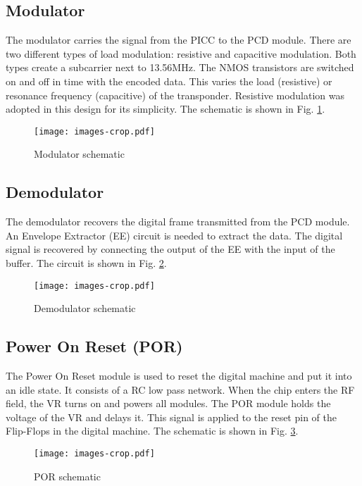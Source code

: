 \subsection{Modulator}

The modulator \cite{rfid_modulador} carries the signal from the PICC to the PCD module. There are two different types of load modulation: resistive and capacitive modulation. Both types create a subcarrier next to 13.56MHz. The NMOS transistors are switched on and off in time with the encoded data. This varies the load (resistive) or resonance frequency  (capacitive) of the transponder.  Resistive modulation was adopted in this design for its simplicity. The schematic is shown in Fig. \ref{fig:mod}.

\begin{figure}[h]
  \centering
  \texttt{[image: images-crop.pdf]}
  \caption{Modulator schematic}
  \label{fig:mod}
\end{figure}

\subsection{Demodulator}

The demodulator recovers the digital frame transmitted from the PCD module. An Envelope Extractor (EE) circuit \cite{rfid_demodulador} is needed to extract the data. The digital signal is recovered by connecting the output of the EE with the input of the buffer. The circuit is shown in Fig. \ref{fig:demod}. 

\begin{figure}[h]
  \centering
  \texttt{[image: images-crop.pdf]}
  \caption{Demodulator schematic}
  \label{fig:demod}
\end{figure}

\subsection{Power On Reset (POR)}

The Power On Reset module is used to reset the digital machine and put it into an idle state. It consists of a RC low pass network. When the chip enters the RF field, the VR turns on and powers all modules. The POR module holds the voltage of the VR and delays it. This signal is applied to the reset pin of the Flip-Flops in the digital machine. The schematic is shown in Fig. \ref{fig:por}. 

\begin{figure}[h]
  \centering
  \texttt{[image: images-crop.pdf]}
  \caption{POR schematic}
  \label{fig:por}
\end{figure}


